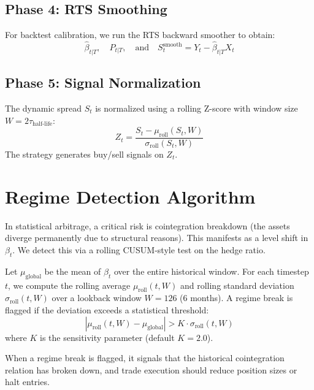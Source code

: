 \documentclass[10pt,a4paper,twocolumn]{article}
\newcommand{\tauhl}{\tau_{\text{half-life}}}
\begin{document}
\subsection{Phase 4: RTS Smoothing}
For backtest calibration, we run the RTS backward smoother to obtain:
\[
  \hat{\beta}_{t|T}, \quad P_{t|T}, \quad \text{and} \quad S_t^{\text{smooth}} = Y_t - \hat{\beta}_{t|T} X_t
\]

\subsection{Phase 5: Signal Normalization}
The dynamic spread $S_t$ is normalized using a rolling Z-score with window size $W = 2\tauhl$:
\[
  Z_t = \frac{S_t - \mu_{\text{roll}}(S_t, W)}{\sigma_{\text{roll}}(S_t, W)}
\]
The strategy generates buy/sell signals on $Z_t$.

\section{Regime Detection Algorithm}

In statistical arbitrage, a critical risk is cointegration breakdown (the assets diverge permanently due to structural reasons). This manifests as a level shift in $\beta_t$. We detect this via a rolling CUSUM-style test on the hedge ratio.

\begin{tcolorbox}[mathbox={Structural Break Detection}]
Let $\mu_{\text{global}}$ be the mean of $\beta_t$ over the entire historical window. For each timestep $t$, we compute the rolling average $\mu_{\text{roll}}(t, W)$ and rolling standard deviation $\sigma_{\text{roll}}(t, W)$ over a lookback window $W = 126$ (6 months). A regime break is flagged if the deviation exceeds a statistical threshold:
\begin{equation}
  \left| \mu_{\text{roll}}(t, W) - \mu_{\text{global}} \right| > K \cdot \sigma_{\text{roll}}(t, W)
\end{equation}
where $K$ is the sensitivity parameter (default $K = 2.0$).
\end{tcolorbox}

When a regime break is flagged, it signals that the historical cointegration relation has broken down, and trade execution should reduce position sizes or halt entries.

\end{document}
